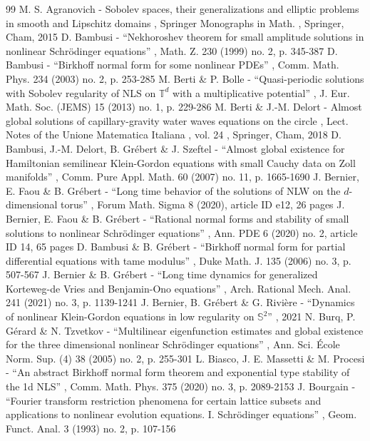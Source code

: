 \documentclass[11pt]{article}
\theoremstyle{definition}
\begin{document}

\begin{thebibliography}{99}
 M. S. Agranovich - Sobolev spaces, their generalizations and elliptic problems in smooth and Lipschitz domains , Springer Monographs in Math. , Springer, Cham, 2015
 D. Bambusi - “Nekhoroshev theorem for small amplitude solutions in nonlinear Schrödinger equations” , Math. Z. 230 (1999) no. 2, p. 345-387
 D. Bambusi - “Birkhoff normal form for some nonlinear PDEs” , Comm. Math. Phys. 234 (2003) no. 2, p. 253-285
 M. Berti \& P. Bolle - “Quasi-periodic solutions with Sobolev regularity of NLS on $\mathbb{T}^d$ with a multiplicative potential” , J. Eur. Math. Soc. (JEMS) 15 (2013) no. 1, p. 229-286
 M. Berti \& J.-M. Delort - Almost global solutions of capillary-gravity water waves equations on the circle , Lect. Notes of the Unione Matematica Italiana , vol. 24 , Springer, Cham, 2018
 D. Bambusi, J.-M. Delort, B. Grébert \& J. Szeftel - “Almost global existence for Hamiltonian semilinear Klein-Gordon equations with small Cauchy data on Zoll manifolds” , Comm. Pure Appl. Math. 60 (2007) no. 11, p. 1665-1690
 J. Bernier, E. Faou \& B. Grébert - “Long time behavior of the solutions of NLW on the $d$-dimensional torus” , Forum Math. Sigma 8 (2020), article ID e12, 26 pages
 J. Bernier, E. Faou \& B. Grébert - “Rational normal forms and stability of small solutions to nonlinear Schrödinger equations” , Ann. PDE 6 (2020) no. 2, article ID 14, 65 pages
 D. Bambusi \& B. Grébert - “Birkhoff normal form for partial differential equations with tame modulus” , Duke Math. J. 135 (2006) no. 3, p. 507-567
 J. Bernier \& B. Grébert - “Long time dynamics for generalized Korteweg-de Vries and Benjamin-Ono equations” , Arch. Rational Mech. Anal. 241 (2021) no. 3, p. 1139-1241
 J. Bernier, B. Grébert \& G. Rivière - “Dynamics of nonlinear Klein-Gordon equations in low regularity on $\mathbb{S}^2$” , 2021
 N. Burq, P. Gérard \& N. Tzvetkov - “Multilinear eigenfunction estimates and global existence for the three dimensional nonlinear Schrödinger equations” , Ann. Sci. École Norm. Sup. (4) 38 (2005) no. 2, p. 255-301
 L. Biasco, J. E. Massetti \& M. Procesi - “An abstract Birkhoff normal form theorem and exponential type stability of the 1d NLS” , Comm. Math. Phys. 375 (2020) no. 3, p. 2089-2153
 J. Bourgain - “Fourier transform restriction phenomena for certain lattice subsets and applications to nonlinear evolution equations. I. Schrödinger equations” , Geom. Funct. Anal. 3 (1993) no. 2, p. 107-156

\end{thebibliography}
\end{document}
